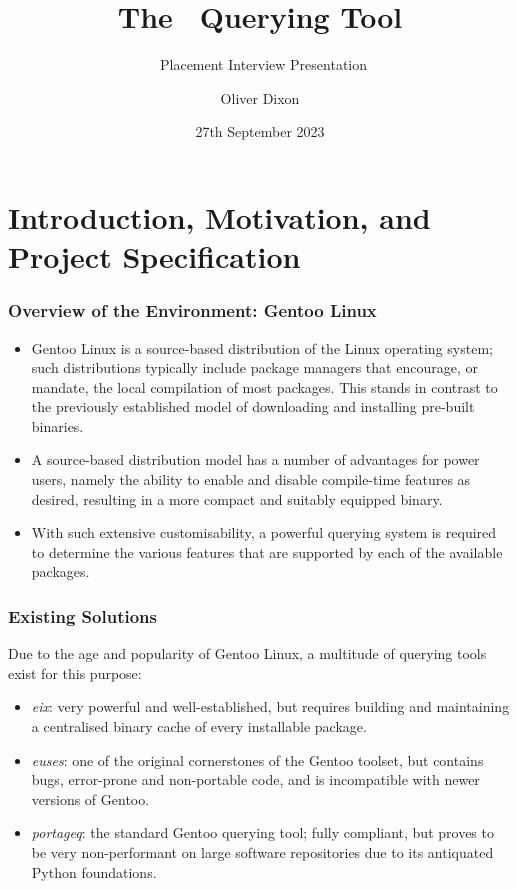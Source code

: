 \documentclass{beamer}
\date{27th September 2023} %
\title[Placement Interview Presentation]{The \programname\ Querying Tool}
\author[Oliver Dixon]{
    \texorpdfstring{Oliver Dixon \raisebox{.5pt}{%
        \texttt{\footnotesize\href{mailto:Oliver Dixon <od641@york.ac.uk>}
            {<od641@york.ac.uk>}}
    }}{Oliver Dixon}}
\institute[University of York]{Department of Computer Science, University of
    York \and Department of Mathematics, University of York}
\subtitle{\companyname\ Placement Interview Presentation}
\numberwithin{figure}{section}
\begin{document}
\frame{\titlepage}
\section{Introduction, Motivation, and Project Specification}
\begin{frame}
    \frametitle{Overview of the Environment: Gentoo Linux}
    \begin{itemize}
        \item Gentoo Linux is a source-based distribution of the Linux operating
            system; such distributions typically include package managers that
            encourage, or mandate, the local compilation of most packages. This
            stands in contrast to the previously established model of
            downloading and installing pre-built binaries.
        \item A source-based distribution model has a number of advantages for
            power users, namely the ability to enable and disable compile-time
            features as desired, resulting in a more compact and suitably
            equipped binary.
        \item With such extensive customisability, a powerful querying system is
            required to determine the various features that are supported by
            each of the available packages.
    \end{itemize}
\end{frame}
\begin{frame}
    \frametitle{Existing Solutions}
    Due to the age and popularity of Gentoo Linux, a multitude of querying tools
    exist for this purpose:
    \pause

    \begin{itemize}
        \item \emph{eix}: very powerful and well-established, but requires
            building and maintaining a centralised binary cache of every
            installable package.
        \item \emph{euses}: one of the original cornerstones of the Gentoo
            toolset, but contains bugs, error-prone and non-portable code, and
            is incompatible with newer versions of Gentoo.
        \item \emph{portageq}: the standard Gentoo querying tool; fully
            compliant, but proves to be very non-performant on large software
            repositories due to its antiquated Python foundations.
    \end{itemize}
\end{frame}
\end{document}
